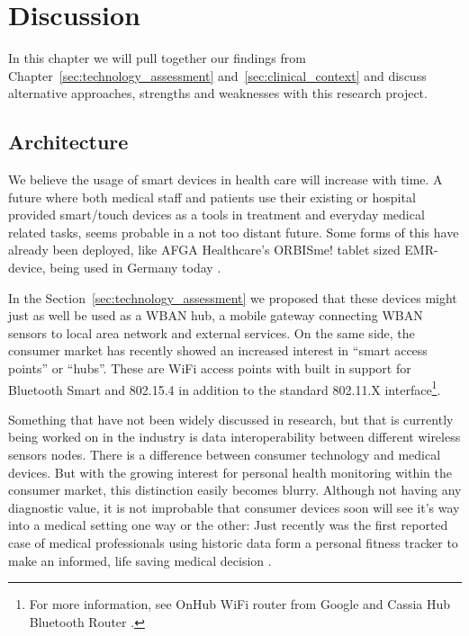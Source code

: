 \section{Discussion} %
\label{sec:discussion}

In this chapter we will pull together our findings from Chapter~\ref{sec:technology_assessment} and~\ref{sec:clinical_context} and discuss alternative approaches, strengths and weaknesses with this research project. 


\subsection{Architecture} %
\label{sub:architecture}

We believe the usage of smart devices in health care will increase with time. A future where both medical staff and patients use their existing or hospital provided smart/touch devices as a tools in treatment and everyday medical related tasks, seems probable in a not too distant future. Some forms of this have already been deployed, like AFGA Healthcare's ORBISme! tablet sized EMR-device, being used in Germany today \cite{newRef:271}. 

In the Section~\ref{sec:technology_assessment} we proposed that these devices might just as well be used as a WBAN hub, a mobile gateway connecting WBAN sensors to local area network and external services. On the same side, the consumer market has recently showed an increased interest in ``smart access points'' or ``hubs''. These are WiFi access points with built in support for Bluetooth Smart and 802.15.4 in addition to the standard 802.11.X interface\footnote{ For more information, see  OnHub WiFi router from Google \cite{newRef:60} and Cassia Hub Bluetooth Router \cite{newRef:61}.}.

Something that have not been widely discussed in research, but that is currently being worked on in the industry is data interoperability between different wireless sensors nodes. There is a difference between consumer technology and medical devices. But with the growing interest for personal health monitoring within the consumer market, this distinction easily becomes blurry. Although not having any diagnostic value, it is not improbable that consumer devices soon will see it's way into a medical setting one way or the other: Just recently was the first reported case of medical professionals using historic data form a personal fitness tracker to make an informed, life saving medical decision \cite{newRef:29}.


